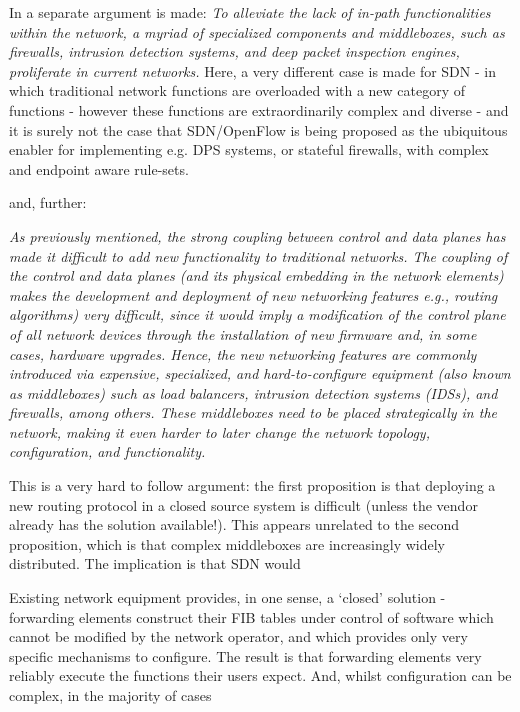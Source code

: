 \bigskip

In  a separate argument is made:
\textit{To alleviate the lack of in-path functionalities within the network, a myriad of specialized components and middleboxes, such as firewalls, intrusion detection systems, and deep packet inspection engines, proliferate in current networks.}
Here, a very different case is made for SDN - in which traditional network functions are overloaded with a new category of functions - however these functions are extraordinarily complex and diverse - and it is surely not the case that SDN/OpenFlow is being proposed as the ubiquitous enabler for implementing e.g. DPS systems, or stateful firewalls, with complex and endpoint aware rule-sets.

and, further:

\textit{As previously mentioned, the strong coupling between control and data planes has made it difficult to add new functionality to traditional networks. The coupling of the control and data planes (and its physical embedding in the network elements) makes the development and deployment of new networking features e.g., routing algorithms) very difficult, since it would imply a modification of the control plane of all network devices through the installation of new firmware and, in some cases, hardware upgrades. Hence, the new networking features are commonly introduced via expensive, specialized, and hard-to-configure equipment (also known as middleboxes) such as load balancers, intrusion detection systems (IDSs), and firewalls, among others. These middleboxes need to be placed strategically in the network, making it even harder to later change the network topology, configuration, and functionality.}


This is a very hard to follow argument: the first proposition is that deploying a new routing protocol in a closed source system is difficult (unless the vendor already has the solution available!).
This appears unrelated to the second proposition, which is that complex middleboxes are increasingly widely distributed.
The implication is that SDN would

Existing network equipment provides, in one sense, a ‘closed’ solution - forwarding elements construct their FIB tables under control of software which cannot be modified by the network operator, and which provides only very specific mechanisms to configure.
The result is that forwarding elements very reliably execute the functions their users expect.
And, whilst configuration can be complex, in the majority of cases

